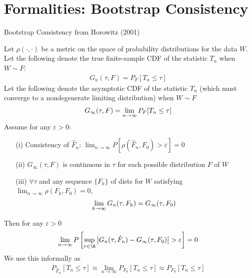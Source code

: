\documentclass[aspectratio=169, handout]{beamer}
\newcommand{\ra}{\rightarrow}
\newcommand{\limn}{\lim_{n\rightarrow\infty}}
\begin{document}


\section{Formalities: Bootstrap Consistency}

{\scriptsize
\begin{frame}{Bootstrap Consistency from Horowitz (2001)}

Let $\rho(\cdot,\cdot)$ be a metric on the space of probability
distributions for the data $W$.
Let the following denote the true finite-sample CDF of the statistic
$T_n$ when $W\sim F$:
\begin{align*}
  G_n(\tau,F) = P_F[T_n\leq \tau]
\end{align*}
Let the following denote the asymptotic CDF of the statistic $T_n$
(which must converge to a nondegenerate limiting distribution)
when $W\sim F$
\begin{align*}
  G_\infty(\tau,F)
  =
  \limn
  P_{F}[T_n\leq \tau]
\vspace{-8pt}
\end{align*}
Assume for any $\varepsilon>0$:
\vspace{-5pt}
\begin{itemize}
  \item[(i)] \alert{Consistency} of $\hat{F}_n$:
    $\limn P[\rho(\hat{F}_n,F_0)>\varepsilon]= 0$
  \item[(ii)] $G_\infty(\tau,F)$ is continuous in $\tau$ for each
    possible distribution $F$ of $W$
  \item[(iii)] $\forall \tau$ and any sequence $\{F_k\}$ of dists for
    $W$ satisfying $\limn \rho(F_k,F_0)=0$,
    \begin{align*}
      \lim_{k\ra\infty}
      G_n(\tau,F_k)
      =
      G_\infty(\tau,F_0)
\vspace{-7pt}
    \end{align*}
\end{itemize}
\vspace{-5pt}
Then for any $\varepsilon>0$
\vspace{-5pt}
\begin{align*}
  \limn
  P\left[
    \sup_{\tau\in \R}
    \big\lvert
    G_n(\tau,\hat{F}_n)-G_\infty(\tau,F_0)
    \big\rvert
    > \varepsilon
  \right]
  =
  0
\end{align*}
\vspace{-10pt}
We use this informally as
\vspace{-10pt}
\begin{align*}
  P_{\hat{F}_n}[T_n\leq \tau]
  \approx
  \limn
  P_{F_0}[T_n\leq \tau]
  \approx
  P_{F_0}[T_n\leq \tau]
\end{align*}

\end{frame}
}
\end{document}
